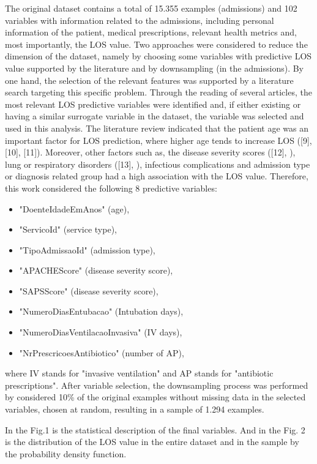 \documentclass[journal]{IEEEtran} %
\begin{document}
The original dataset contains a total of 15.355 examples (admissions) and 102 variables with information related to the admissions, including personal information of the patient, medical prescriptions, relevant health metrics and, most importantly, the LOS value. Two approaches were considered to reduce the dimension of the dataset, namely by choosing some variables with predictive LOS value supported by the literature and by downsampling (in the admissions).
By one hand, the selection of the relevant features was supported by a literature search targeting this specific problem. Through the reading of several articles, the most relevant LOS predictive variables were identified and, if either existing or having a similar surrogate variable in the dataset, the variable was selected and used in this analysis. The literature review indicated that the patient age was an important factor for LOS prediction, where higher age tends to increase LOS ([9], [10], [11]). Moreover, other factors such as, the disease severity scores ([12], \cite{DBLP:journals/corr/abs-2201-00005}), lung or respiratory disorders ([13], \cite{Zolbanin2022}), infectious complications \cite{DBLP:journals/corr/abs-2201-00005} and admission type or diagnosis related group \cite{DBLP:journals/corr/abs-2201-00005} had a high association with the LOS value. Therefore, this work considered the following 8 predictive variables:
\begin{itemize}
    \item "DoenteIdadeEmAnos" (age), 
    \item "ServicoId" (service type), 
    \item "TipoAdmissaoId" (admission type), 
    \item "APACHEScore" (disease severity score), \item "SAPSScore" (disease severity score), \item "NumeroDiasEntubacao" (Intubation days), 
    \item "NumeroDiasVentilacaoInvasiva" (IV days), 
    \item "NrPrescricoesAntibiotico" (number of AP), 
\end{itemize}
where IV stands for "invasive ventilation" and AP stands for "antibiotic prescriptions". 
After variable selection, the downsampling process was performed by considered 10\% of the original examples without missing data in the selected variables, chosen at random, resulting in a sample of 1.294 examples.

In the Fig.1 is the statistical description of the final variables. And in the Fig. 2 is the distribution of the LOS value in the entire dataset and in the sample by the probability density function.\newline
\end{document}
